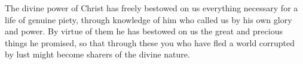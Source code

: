 
\lettrine{T}{}he divine power of Christ has freely bestowed on us everything necessary for a life of genuine piety, through knowledge of him who called us by his own glory and power. By virtue of them he has bestowed on us the great and precious things he promised, so that through these you who have fled a world corrupted by lust might become sharers of the divine nature.